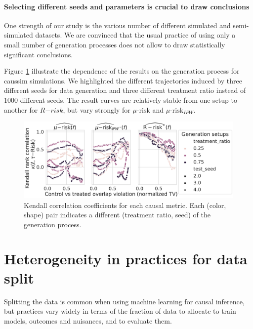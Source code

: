 \documentclass[french,12pt,twoside,a4paper]{book}
\begin{document}
\begin{appendices}
  \paragraph{Selecting different seeds and parameters is crucial to draw conclusions}%
  \label{{apd:results:seed_effect}}%

  One strength of our study is the various number of different simulated and
  semi-simulated datasets. We are convinced that the usual practice of using only
  a small number of generation processes does not allow to draw statistically
  significant conclusions.

  Figure \ref{apd:results:fig:seed_effect} illustrate the dependence of the
  results on the generation process for caussim simulations. We highlighted the
  different trajectories induced by three different seeds for data generation and
  three different treatment ratio instead of 1000 different seeds. The result
  curves are relatively stable from one setup to another for $R{-risk}$, but vary
  strongly for $\mu\text{-risk}$ and $\mu\text{-risk}_{IPW}$.

  \begin{figure}
    \centering
    \caption{Kendall correlation coefficients for each causal metric. Each (color,
      shape) pair indicates a different (treatment ratio, seed) of the generation
      process.}\label {apd:results:fig:seed_effect}
    \includegraphics[width=\linewidth]{img/chapter_5/caussim_seed_effect.pdf}
  \end{figure}

  \FloatBarrier

  \section{Heterogeneity in practices for data split}\label{apd:results:k_fold_choices}

  Splitting the data is common when using machine learning for causal
  inference, but practices vary widely in terms of the fraction of data to
  allocate to train models, outcomes and nuisances, and to evaluate them.


\end{appendices}
\end{document}
